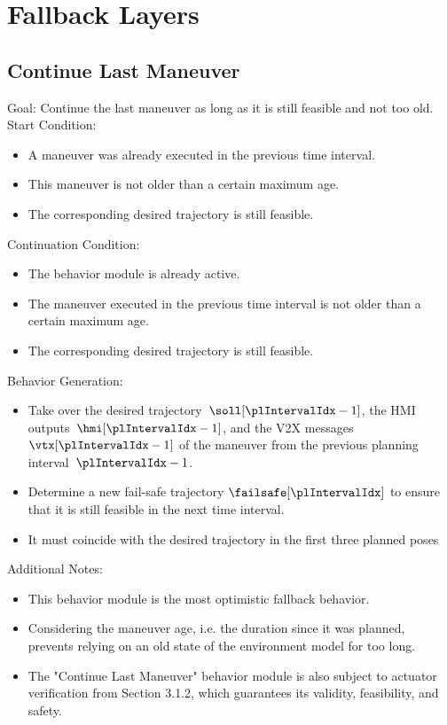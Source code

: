 \section{Fallback Layers}

\subsection{Continue Last Maneuver}

    Goal: Continue the last maneuver as long as it is still feasible and not too old.
    Start Condition:

\begin{itemize}
    \item A maneuver was already executed in the previous time interval.
    \item This maneuver is not older than a certain maximum age.
    \item The corresponding desired trajectory is still feasible.
\end{itemize}

    Continuation Condition:

\begin{itemize}
    \item The behavior module is already active.
    \item The maneuver executed in the previous time interval is not older than a certain maximum age.
    \item The corresponding desired trajectory is still feasible.
\end{itemize}

    Behavior Generation:

\begin{itemize}
    \item Take over the desired trajectory~$\soll[\plIntervalIdx-1]$, the HMI outputs~$\hmi[\plIntervalIdx-1]$, and the V2X messages~$\vtx[\plIntervalIdx-1]$ of the maneuver from the previous planning interval~${\plIntervalIdx-1}$.
    \item Determine a new fail-safe trajectory $\failsafe[\plIntervalIdx]$ to ensure that it is still feasible in the next time interval.
    \item It must coincide with the desired trajectory in the first three planned poses
\end{itemize}

Additional Notes:

\begin{itemize}
    \item This behavior module is the most optimistic fallback behavior.
    \item Considering the maneuver age, i.e. the duration since it was planned, prevents relying on an old state of the environment model for too long.
    \item The "Continue Last Maneuver" behavior module is also subject to actuator verification from Section 3.1.2, which guarantees its validity, feasibility, and safety.
\end{itemize}


